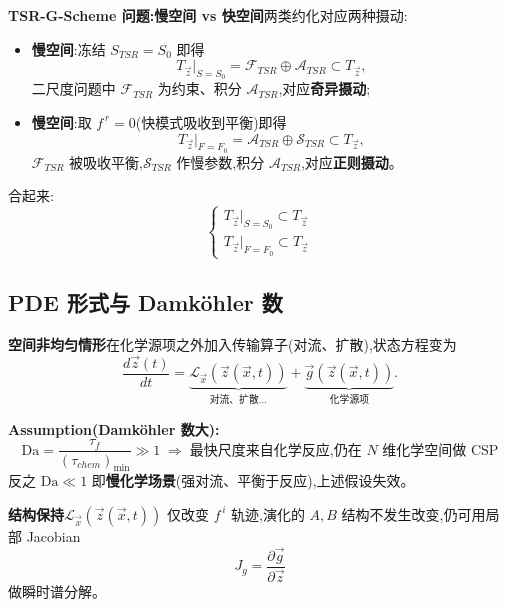 \documentclass[11pt,a4paper]{article}
\newcommand{\Jg}{J_{\!g}}
\newcommand{\diff}[2]{\dfrac{d #1}{d #2}}
\newcommand{\pdiff}[2]{\dfrac{\partial #1}{\partial #2}}
\begin{document}
\noindent\textbf{TSR-G-Scheme 问题:慢空间 vs 快空间}\quad 两类约化对应两种摄动:
\begin{itemize}[leftmargin=2em]
\item \textbf{慢空间}:冻结 $S_{TSR}=S_0$ 即得
\begin{equation}
T_{\vec z}\big|_{S=S_0}=\mathcal F_{TSR}\oplus \mathcal A_{TSR}\subset T_{\vec z},
\end{equation}
二尺度问题中 $\mathcal F_{TSR}$ 为约束、积分 $\mathcal A_{TSR}$,对应\textbf{奇异摄动};
\item \textbf{慢空间}:取 $f^{\,r}=0$(快模式吸收到平衡)即得
\begin{equation}
T_{\vec z}\big|_{F=F_0}=\mathcal A_{TSR}\oplus \mathcal S_{TSR}\subset T_{\vec z},
\end{equation}
$\mathcal F_{TSR}$ 被吸收平衡,$\mathcal S_{TSR}$ 作慢参数,积分 $\mathcal A_{TSR}$,对应\textbf{正则摄动}。
\end{itemize}
合起来:
\begin{equation}
\begin{cases}T_{\vec z}\big|_{S=S_0}\subset T_{\vec z}\\[2pt]
T_{\vec z}\big|_{F=F_0}\subset T_{\vec z}\end{cases}
\end{equation}

\subsection{PDE 形式与 Damköhler 数}

\noindent\textbf{空间非均匀情形}\quad 在化学源项之外加入传输算子(对流、扩散),状态方程变为
\begin{equation}
\diff{\vec z(t)}{t}=\underbrace{\mathcal L_{\vec x}(\vec z(\vec x,t))}_{\text{对流、扩散}\dots}+\underbrace{\vec g(\vec z(\vec x,t))}_{\text{化学源项}}.
\end{equation}

\noindent\textbf{Assumption(Damköhler 数大):}
\begin{equation}
\mathrm{Da}=\frac{\tau_f}{(\tau_{chem})_{\min}}\gg 1\;\Longrightarrow\;\text{最快尺度来自化学反应,仍在 $N$ 维化学空间做 CSP}\nonumber						
\end{equation}
反之 $\mathrm{Da}\ll 1$ 即\textbf{慢化学场景}(强对流、平衡于反应),上述假设失效。

\medskip
\noindent\textbf{结构保持}\quad $\mathcal L_{\vec x}(\vec z(\vec x,t))$ 仅改变 $f^{\,i}$ 轨迹,演化的 $A,B$ 结构不发生改变,仍可用局部 Jacobian
\begin{equation}
\Jg=\pdiff{\vec g}{\vec z}
\end{equation}
做瞬时谱分解。
\end{document}
